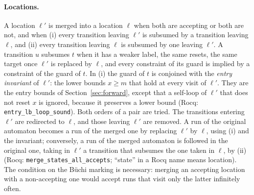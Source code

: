 \paragraph{Locations.}
A location $\ell'$ is merged into a location $\ell$ when both are accepting or
both are not, and when (i) every transition leaving $\ell'$ is subsumed by a
transition leaving $\ell$, and (ii) every transition leaving $\ell$ is subsumed
by one leaving $\ell'$.  A transition $u$ subsumes $t$ when it has a weaker
label, the same resets, the same target once $\ell'$ is replaced by $\ell$, and
every constraint of its guard is implied by a constraint of the guard of $t$.
In (i) the guard of $t$ is conjoined with the \emph{entry invariant} of
$\ell'$: the lower bounds $x\ge m$ that hold at every visit of $\ell'$.  They
are the entry bounds of Section~\ref{sec:forward}, except that a self-loop of
$\ell'$ that does not reset $x$ is ignored, because it preserves a lower bound
(Rocq: \texttt{entry\_\allowbreak{}lb\_\allowbreak{}loop\_\allowbreak{}sound}).
Both orders of a pair are tried.  The transitions entering
$\ell'$ are redirected to $\ell$, and those leaving $\ell'$ are removed.  A run
of the original automaton becomes a run of the merged one by replacing $\ell'$
by $\ell$, using (i) and the invariant; conversely, a run of the merged
automaton is followed in the original one, taking in $\ell'$ a transition that
subsumes the one taken in $\ell$, by (ii)
(Rocq: \texttt{merge\_\allowbreak{}states\_\allowbreak{}all\_\allowbreak{}accepts}; ``state'' in a Rocq name
means location).  The condition on the B\"uchi marking is necessary: merging
an accepting location with a non-accepting one would accept runs that visit only the latter infinitely
often.
